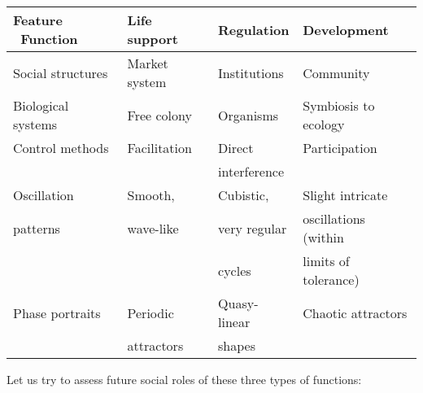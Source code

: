 \vspace{5mm}
\begin{tabular}{|l|l|l|l|} \hline
 Feature \ Function & Life support &  Regulation &    Development      \\ \hline\hline
 Social structures & Market system& Institutions& Community           \\  \hline
 Biological systems& Free colony  & Organisms   & Symbiosis to ecology\\  \hline
 Control methods   & Facilitation & Direct      & Participation       \\
                   &              & interference&                     \\  \hline
 Oscillation       & Smooth,      & Cubistic,   & Slight intricate    \\
   patterns        &  wave-like   & very regular& oscillations (within\\
                   &              & cycles      & limits of tolerance)\\  \hline
 Phase portraits   & Periodic     & Quasy-linear& Chaotic attractors \\
                   &  attractors  & shapes      &                     \\  \hline
\end{tabular}

\vspace{5mm}
     Let us try to assess future social roles of these three types  of
functions:

